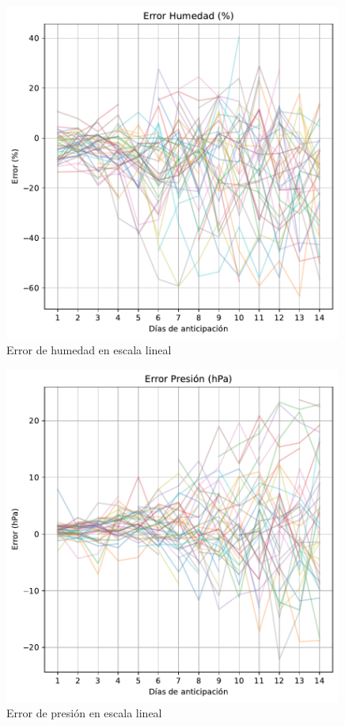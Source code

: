 \documentclass[
  10pt,
  a4paper,
  DIV=11,
  numbers=noendperiod,
  open=any]{scrreprt}
\numberwithin{equation}{chapter}
\numberwithin{equation}{section}
\renewcommand{\[}{\begin{equation}}
\renewcommand{\]}{\end{equation}}
\begin{document}
\begin{figure}[h]
  \centering
  \includegraphics[width=0.99\textwidth]{03-meteorologia/predicciones_files/figure-pdf/cell-2-output-2.pdf}
  \caption{Error de humedad en escala lineal}
\end{figure}

\begin{figure}[h]
  \centering
  \includegraphics[width=0.99\textwidth]{03-meteorologia/predicciones_files/figure-pdf/cell-2-output-3.pdf}
  \caption{Error de presión en escala lineal}
\end{figure}
\end{document}

